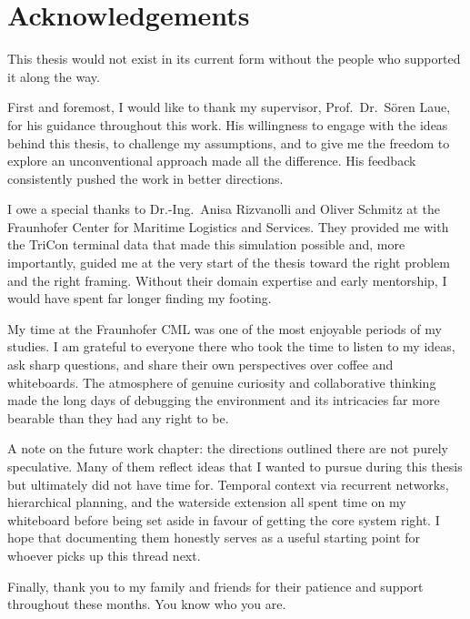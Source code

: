 \chapter*{Acknowledgements}

This thesis would not exist in its current form without the people who supported it along the way.

First and foremost, I would like to thank my supervisor, Prof.~Dr.~Sören Laue, for his guidance throughout this work. His willingness to engage with the ideas behind this thesis, to challenge my assumptions, and to give me the freedom to explore an unconventional approach made all the difference. His feedback consistently pushed the work in better directions.

I owe a special thanks to Dr.-Ing.~Anisa Rizvanolli and Oliver Schmitz at the Fraunhofer Center for Maritime Logistics and Services. They provided me with the TriCon terminal data that made this simulation possible and, more importantly, guided me at the very start of the thesis toward the right problem and the right framing. Without their domain expertise and early mentorship, I would have spent far longer finding my footing.

My time at the Fraunhofer CML was one of the most enjoyable periods of my studies. I am grateful to everyone there who took the time to listen to my ideas, ask sharp questions, and share their own perspectives over coffee and whiteboards. The atmosphere of genuine curiosity and collaborative thinking made the long days of debugging the environment and its intricacies far more bearable than they had any right to be.

A note on the future work chapter: the directions outlined there are not purely speculative. Many of them reflect ideas that I wanted to pursue during this thesis but ultimately did not have time for. Temporal context via recurrent networks, hierarchical planning, and the waterside extension all spent time on my whiteboard before being set aside in favour of getting the core system right. I hope that documenting them honestly serves as a useful starting point for whoever picks up this thread next.

Finally, thank you to my family and friends for their patience and support throughout these months. You know who you are.
